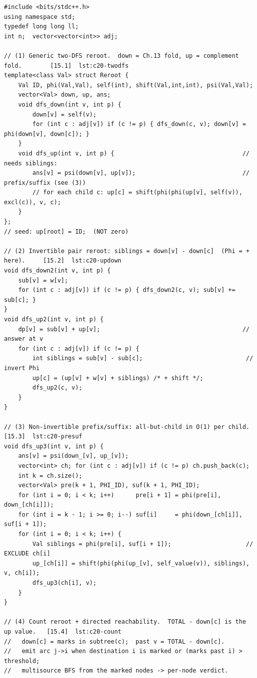 \begin{lstlisting}[caption={Chapter 15 code kit: the generic two-DFS reroot, the invertible pair (subtract the child), the non-invertible prefix/suffix, the count reroot with directed reachability, and the Summit's width-2k distance-histogram reroot}, label={lst:c20-kit}]
#include <bits/stdc++.h>
using namespace std;
typedef long long ll;
int n;  vector<vector<int>> adj;

// (1) Generic two-DFS reroot.  down = Ch.13 fold, up = complement fold.        [15.1]  lst:c20-twodfs
template<class Val> struct Reroot {
    Val ID, phi(Val,Val), self(int), shift(Val,int,int), psi(Val,Val);
    vector<Val> down, up, ans;
    void dfs_down(int v, int p) {
        down[v] = self(v);
        for (int c : adj[v]) if (c != p) { dfs_down(c, v); down[v] = phi(down[v], down[c]); }
    }
    void dfs_up(int v, int p) {                                    // needs siblings:
        ans[v] = psi(down[v], up[v]);                              // prefix/suffix (see (3))
        // for each child c: up[c] = shift(phi(phi(up[v], self(v)), excl(c)), v, c);
    }
};
// seed: up[root] = ID;  (NOT zero)

// (2) Invertible pair reroot: siblings = down[v] - down[c]  (Phi = + here).     [15.2]  lst:c20-updown
void dfs_down2(int v, int p) {
    sub[v] = w[v];
    for (int c : adj[v]) if (c != p) { dfs_down2(c, v); sub[v] += sub[c]; }
}
void dfs_up2(int v, int p) {
    dp[v] = sub[v] + up[v];                                        // answer at v
    for (int c : adj[v]) if (c != p) {
        int siblings = sub[v] - sub[c];                             // invert Phi
        up[c] = (up[v] + w[v] + siblings) /* + shift */;
        dfs_up2(c, v);
    }
}

// (3) Non-invertible prefix/suffix: all-but-child in O(1) per child.            [15.3]  lst:c20-presuf
void dfs_up3(int v, int p) {
    ans[v] = psi(down_[v], up_[v]);
    vector<int> ch; for (int c : adj[v]) if (c != p) ch.push_back(c);
    int k = ch.size();
    vector<Val> pre(k + 1, PHI_ID), suf(k + 1, PHI_ID);
    for (int i = 0; i < k; i++)      pre[i + 1] = phi(pre[i], down_[ch[i]]);
    for (int i = k - 1; i >= 0; i--) suf[i]     = phi(down_[ch[i]], suf[i + 1]);
    for (int i = 0; i < k; i++) {
        Val siblings = phi(pre[i], suf[i + 1]);                     // EXCLUDE ch[i]
        up_[ch[i]] = shift(phi(phi(up_[v], self_value(v)), siblings), v, ch[i]);
        dfs_up3(ch[i], v);
    }
}

// (4) Count reroot + directed reachability.  TOTAL - down[c] is the up value.   [15.4]  lst:c20-count
//   down[c] = marks in subtree(c);  past v = TOTAL - down[c].
//   emit arc j->i when destination i is marked or (marks past i) > threshold;
//   multisource BFS from the marked nodes -> per-node verdict.


\end{lstlisting}
